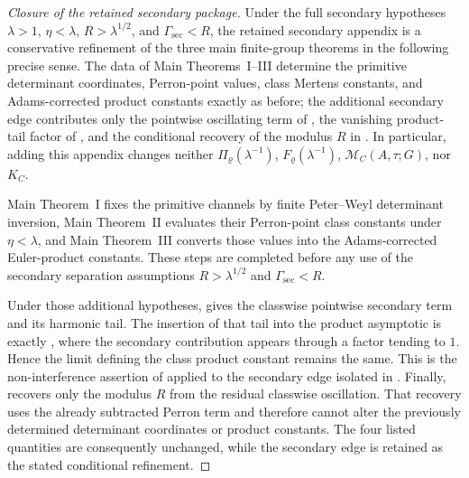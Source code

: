 \begin{proof}[Closure of the retained secondary package]
  Under the full secondary hypotheses
  \(\lambda>1\), \(\eta<\lambda\), \(R>\lambda^{1/2}\), and
  \(\Gamma_{\mathrm{sec}}<R\), the retained secondary appendix is a
  conservative refinement of the three main finite-group theorems in the
  following precise sense.  The data of Main Theorems~I--III determine the
  primitive determinant coordinates, Perron-point values, class Mertens
  constants, and Adams-corrected product constants exactly as before; the
  additional secondary edge contributes only the pointwise oscillating term
  of , the vanishing product-tail
  factor of , and the conditional
  recovery of the modulus \(R\) in
  .  In particular, adding
  this appendix changes neither \(\Pi_\varrho(\lambda^{-1})\),
  \(F_\varrho(\lambda^{-1})\), \(\mathcal M_C(A,\tau;G)\), nor \(K_C\).

  Main Theorem~I fixes the primitive channels by finite Peter--Weyl
  determinant inversion, Main Theorem~II evaluates their Perron-point class
  constants under \(\eta<\lambda\), and Main Theorem~III converts those
  values into the Adams-corrected Euler-product constants.  These steps are
  completed before any use of the secondary separation assumptions
  \(R>\lambda^{1/2}\) and \(\Gamma_{\mathrm{sec}}<R\).

  Under those additional hypotheses,
   gives the classwise pointwise
  secondary term and its harmonic tail.  The insertion of that tail into the
  product asymptotic is exactly
  , where the secondary contribution
  appears through a factor tending to \(1\).  Hence the limit defining the
  class product constant remains the same.  This is the non-interference
  assertion of  applied to
  the secondary edge isolated in .
  Finally,  recovers only the
  modulus \(R\) from the residual classwise oscillation.  That recovery uses
  the already subtracted Perron term and therefore cannot alter the previously
  determined determinant coordinates or product constants.  The four listed
  quantities are consequently unchanged, while the secondary edge is retained
  as the stated conditional refinement.
\end{proof}

